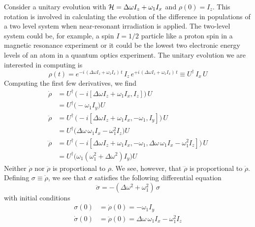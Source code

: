  Consider a unitary evolution with ${\cal H} = \Delta \omega I_z + \omega_1 I_x$ and $\rho(0) = I_z$.  This rotation is involved in calculating the evolution of the difference in populations of a two level system when near-resonant irradiation is applied.  The two-level system could be, for example, a spin $I = 1/2$ particle like a proton spin in a magnetic resonance experiment or it could be the lowest two electronic energy levels of an atom in a quantum optics experiment.  The unitary evolution we are interested in computing is
\begin{equation}
\rho(t)
	= e^{-i \, (\Delta \omega I_z + \omega_1 I_x) \, t}
	  \, I_z \,
	 e^{+i \, (\Delta \omega I_z + \omega_1 I_x) \, t}
	\equiv U^{\dagger} \, I_{x} \, U
	\label{Eq:Example4}  
\end{equation}
Computing the first few derivatives, we find
\begin{subequations}
\begin{align}
\dot{\rho} & = U^{\dagger} \, 
	\big( 
		-i [\Delta \omega I_z + \omega_1 I_x, I_z]
	\big) \, U \\
	& = U^{\dagger} \big( 
		-\omega_1 I_y 
	\big) U \\
\ddot{\rho} & = U^{\dagger} \, 
	\big(  
		-i [\Delta \omega I_z + \omega_1 I_x, -\omega_1, I_y]
	\big) \, U \\
	& = U^{\dagger} \big( 
		\Delta \omega \, \omega_1 I_x - \omega_1^2 I_z 
	\big) U \\
\dddot{\rho} & = U^{\dagger} \, 
	\big(  
		-i [\Delta \omega I_z + \omega_1 I_x, -\omega_1, 
				\Delta \omega \, \omega_1 I_x - \omega_1^2 I_z]
	\big) \, U \\
	& = U^{\dagger} \big( 
		\omega_1 \left( 
			\omega_1^2 + \Delta \omega^2
		\right) I_y
	\big) U
\end{align}
\end{subequations} 
Neither $\dot{\rho}$ nor $\ddot{\rho}$ is proportional to $\rho$.    We see, however, that $\dddot{\rho}$ is proportional to $\dot{\rho}$.  Defining $\sigma \equiv \dot{\rho}$, we see that $\sigma$ satisfies the following differential equation
\begin{equation}
\ddot{\sigma} 
	= - (\Delta \omega^2 + \omega_1^2) \, \sigma
	\label{Eq:Example4-ODE}
\end{equation}
with initial conditions
\begin{subequations}
\begin{align}
\sigma(0) 
	& = \dot{\rho}(0) 
	  = - \omega_1 I_y \\
\dot{\sigma}(0) 
	& = \ddot{\rho}(0)
	  = \Delta \omega \, \omega_1 I_x - \omega_1^2 I_z 
\end{align}
\end{subequations}
